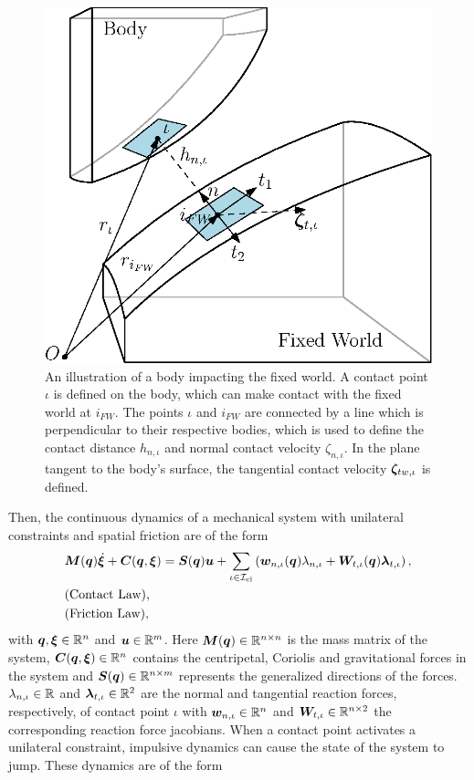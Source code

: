 \documentclass[../DC2017114Bouma.tex]{subfiles}
\begin{document}
\begin{figure}[h]
\centering
\includegraphics[width=.5\textwidth]{contactplanes.eps}\caption{An illustration of a body impacting the fixed world. A contact point $\iota$ is defined on the body, which can make contact with the fixed world at $i_{FW}$. The points $\iota$ and $i_{FW}$ are connected by a line which is perpendicular to their respective bodies, which is used to define the contact distance $h_{n,\iota}$ and normal contact velocity $\zeta_{n,\iota}$. In the plane tangent to the body's surface, the tangential contact velocity $\boldsymbol{\zeta}_{tw,\iota}$ is defined.} \label{fig:contactplanes}
\end{figure}

Then, the continuous dynamics of a mechanical system with unilateral constraints and spatial friction are of the form
\begin{align}
&{\boldsymbol{M}}({\boldsymbol{q}})\dot{\boldsymbol{\xi}} + {\boldsymbol{C}}({\boldsymbol{q}},\boldsymbol{\xi}) = {\boldsymbol{S}}({\boldsymbol{q}}){\boldsymbol{u}} + \sum_{\iota\in\mathcal{I}_{\text{cl}}}\left({\boldsymbol{w}}_{n,\iota}({\boldsymbol{q}})\lambda_{n,\iota} + {\boldsymbol{W}}_{t,\iota}({\boldsymbol{q}})\boldsymbol{\lambda}_{t,\iota} \right), \label{eq:appcont1}\\
&\text{(Contact Law)},\label{eq:appcont2}\\
&\text{(Friction Law)},\label{eq:appcont3}
\end{align}
%
%
%
%
%
%
%
with ${\boldsymbol{q}},\boldsymbol{\xi}\in\mathbb{R}^{n}$ and ${\boldsymbol{u}}\in\mathbb{R}^m$. Here ${\boldsymbol{M}}({\boldsymbol{q}})\in\mathbb{R}^{n\times n}$ is the mass matrix of the system, ${\boldsymbol{C}}({\boldsymbol{q}},\boldsymbol{\xi})\in\mathbb{R}^{n}$ contains the centripetal, Coriolis and gravitational forces in the system and ${\boldsymbol{S}}({\boldsymbol{q}})\in\mathbb{R}^{n\times m}$ represents the generalized directions of the forces. $\lambda_{n,\iota}\in\mathbb{R}$ and $\boldsymbol{\lambda}_{t,\iota}\in\mathbb{R}^{2}$ are the normal and tangential reaction forces, respectively, of contact point $\iota$ with ${\boldsymbol{w}}_{n,\iota}\in\mathbb{R}^{n}$ and ${\boldsymbol{W}}_{t,\iota}\in\mathbb{R}^{n\times 2}$ the corresponding reaction force jacobians. When a contact point activates a unilateral constraint, impulsive dynamics can cause the state of the system to jump. These dynamics are of the form
\end{document}
